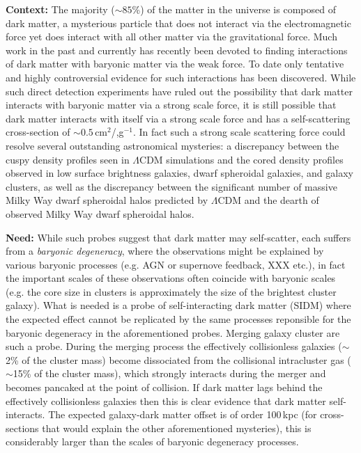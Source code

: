 
\noindent\textbf{Context:} 
The majority ($\sim85$\%) of the matter in the universe is composed of dark matter, a mysterious particle that does not interact via the electromagnetic force yet does interact with all other matter via the gravitational force.
Much work in the past and currently has recently been devoted to finding interactions of dark matter with baryonic matter via the weak force.
To date only tentative and highly controversial evidence for such interactions has been discovered.
While such direct detection experiments have ruled out the possibility that dark matter interacts with baryonic matter via a strong scale force, it is still possible that dark matter interacts with itself via a strong scale force and has a self-scattering cross-section of $\sim0.5$\,cm$^2$/,g$^{-1}$.
In fact such a strong scale scattering force could resolve several outstanding astronomical mysteries: a discrepancy between the cuspy density profiles seen in $\Lambda$CDM simulations and the cored density profiles observed in low surface brightness galaxies, dwarf spheroidal galaxies, and galaxy clusters, as well as the discrepancy between the significant number of massive Milky Way dwarf spheroidal halos predicted by $\Lambda$CDM and the dearth of observed Milky Way dwarf spheroidal halos.
 


\noindent\textbf{Need:} 
While such probes suggest that dark matter may self-scatter, each suffers from a \emph{baryonic degeneracy}, where the observations might be explained by various baryonic processes (e.g. AGN or supernove feedback, XXX etc.), in fact the important scales of these observations often coincide with baryonic scales (e.g. the core size in clusters is approximately the size of the brightest cluster galaxy).
What is needed is a probe of self-interacting dark matter (SIDM) where the expected effect cannot be replicated by the same processes reponsible for the baryonic degeneracy in the aforementioned probes.
Merging galaxy cluster are such a probe.
During the merging process the effectively collisionless galaxies ($\sim$2\% of the cluster mass) become dissociated from the collisional intracluster gas ($\sim$15\% of the cluster mass), which strongly interacts during the merger and becomes pancaked at the point of collision.
If dark matter lags behind the effectively collisionless galaxies then this is clear evidence that dark matter self-interacts.
The expected galaxy-dark matter offset is of order 100\,kpc (for cross-sections that would explain the other aforementioned mysteries), this is considerably larger than the scales of baryonic degeneracy processes.

